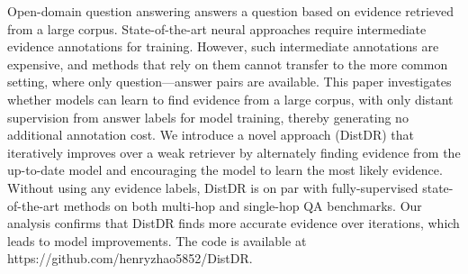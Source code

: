 Open-domain question answering answers a question based on evidence retrieved from a large corpus. State-of-the-art neural approaches require intermediate evidence annotations for training. However, such intermediate annotations are expensive, and methods that rely on them cannot transfer to the more common setting, where only question---answer pairs are available. This paper investigates whether models can learn to find evidence from a large corpus, with only distant supervision from answer labels for model training, thereby generating no additional annotation cost. We introduce a novel approach (DistDR) that iteratively improves over a weak retriever by alternately finding evidence from the up-to-date model and encouraging the model to learn the most likely evidence. Without using any evidence labels, DistDR is on par with fully-supervised state-of-the-art methods on both multi-hop and single-hop QA benchmarks. Our analysis confirms that DistDR finds more accurate evidence over iterations, which leads to model improvements. The code is available at https://github.com/henryzhao5852/DistDR.
